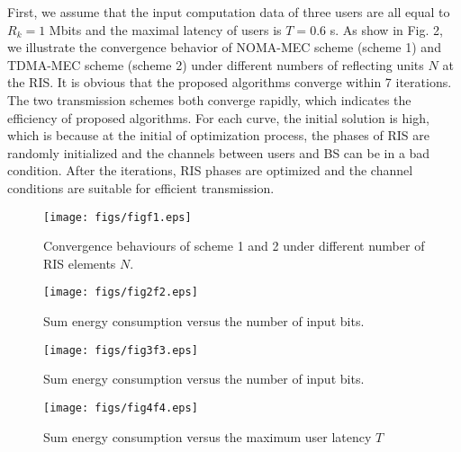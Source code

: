 \documentclass[journal]{IEEEtran}
\begin{document}
First, we assume that the input computation data of three users are all equal to $R_k=1$ Mbits and the maximal latency of users is $T=0.6$ s. As show in Fig. 2, we illustrate the convergence behavior of NOMA-MEC scheme (scheme 1) and TDMA-MEC scheme (scheme 2) under different numbers of reflecting units $N$ at the RIS. It is obvious that the proposed algorithms converge within 7 iterations. The two transmission schemes both converge rapidly, which indicates the efficiency of proposed algorithms.
For each curve, the initial solution is high, which is because at the initial of optimization process, the phases of RIS are randomly initialized and the channels between users and BS can be in a bad condition.
After the iterations, RIS phases are optimized and the channel conditions are suitable for efficient transmission.%

\begin{figure}[htb]
	\centering
	\texttt{[image: figs/figf1.eps]}
	\vspace{-1.5em}
	\caption{Convergence behaviours of scheme 1 and 2 under different number of RIS elements $N$.}\label{fig_1}
	\vspace{-.5em}
\end{figure}

\begin{figure}[htb]
	\centering
	\texttt{[image: figs/fig2f2.eps]}
	\vspace{-1.5em}
	\caption{Sum energy consumption versus the number of input bits.}\label{fig_2}
	\vspace{-.5em}
\end{figure}

\begin{figure}[htb]
	\centering
	\texttt{[image: figs/fig3f3.eps]}
	\vspace{-1.5em}
	\caption{ Sum energy consumption versus the number of input bits.}\label{fig_3}
	\vspace{-.5em}
\end{figure}

\begin{figure}[htb]
	\centering
	\texttt{[image: figs/fig4f4.eps]}
	\vspace{-1.5em}
	\caption{ Sum energy consumption versus the maximum user latency $T$}\label{fig_4}
	\vspace{-.5em}
\end{figure}
\end{document}
